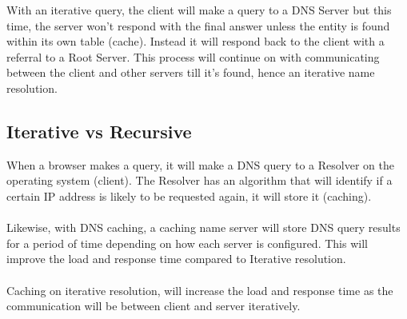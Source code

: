 \documentclass[14pt]{article}
\begin{document}
With an iterative query, the client will make a query to a DNS Server but this time, the server won’t respond with the final answer unless the entity is found within its own table (cache). Instead it will respond back to the client with a referral to a Root Server. This process will continue on with communicating between the client and other servers till it’s found, hence an iterative name resolution.

\subsection{Iterative vs Recursive}

When a browser makes a query, it will make a DNS query to a Resolver on the operating system (client). The Resolver has an algorithm that will identify if a certain IP address is likely to be requested again, it will store it (caching). \\\\Likewise, with DNS caching, a caching name server will store DNS query results for a period of time depending on how each server is configured. This will improve the load and response time compared to Iterative resolution. \\\\Caching on iterative resolution, will increase the load and response time as the communication will be between client and server iteratively.
\end{document}
